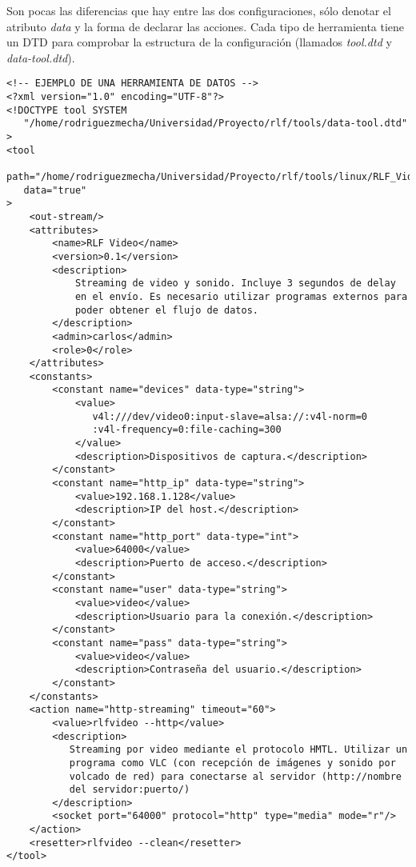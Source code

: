 Son pocas las diferencias que hay entre las dos configuraciones, sólo 
denotar el atributo \emph{data} y la forma de declarar las acciones. 
Cada tipo de herramienta tiene un DTD para comprobar la estructura de 
la configuración (llamados \emph{tool.dtd} y \emph{data-tool.dtd}).

\begin{verbatim}
<!-- EJEMPLO DE UNA HERRAMIENTA DE DATOS -->
<?xml version="1.0" encoding="UTF-8"?>
<!DOCTYPE tool SYSTEM
   "/home/rodriguezmecha/Universidad/Proyecto/rlf/tools/data-tool.dtd"
>
<tool 
   path="/home/rodriguezmecha/Universidad/Proyecto/rlf/tools/linux/RLF_Video"
   data="true"
>
    <out-stream/>
    <attributes>
        <name>RLF Video</name>
        <version>0.1</version>
        <description>
            Streaming de video y sonido. Incluye 3 segundos de delay 
            en el envío. Es necesario utilizar programas externos para 
            poder obtener el flujo de datos.
        </description>
        <admin>carlos</admin>
        <role>0</role>
    </attributes>
    <constants>
        <constant name="devices" data-type="string">
            <value>
               v4l:///dev/video0:input-slave=alsa://:v4l-norm=0
               :v4l-frequency=0:file-caching=300
            </value>
            <description>Dispositivos de captura.</description>
        </constant>
        <constant name="http_ip" data-type="string">
            <value>192.168.1.128</value>
            <description>IP del host.</description>
        </constant>
        <constant name="http_port" data-type="int">
            <value>64000</value>
            <description>Puerto de acceso.</description>
        </constant>
        <constant name="user" data-type="string">
            <value>video</value>
            <description>Usuario para la conexión.</description>
        </constant>
        <constant name="pass" data-type="string">
            <value>video</value>
            <description>Contraseña del usuario.</description>
        </constant>
    </constants>
    <action name="http-streaming" timeout="60">
        <value>rlfvideo --http</value>
        <description>
           Streaming por video mediante el protocolo HMTL. Utilizar un 
           programa como VLC (con recepción de imágenes y sonido por 
           volcado de red) para conectarse al servidor (http://nombre 
           del servidor:puerto/)
        </description>
        <socket port="64000" protocol="http" type="media" mode="r"/>
    </action>
    <resetter>rlfvideo --clean</resetter>
</tool>
\end{verbatim}

